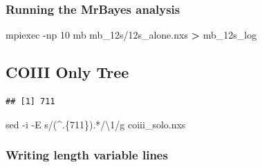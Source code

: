 \documentclass[
]{article}
\newenvironment{Shaded}{\begin{snugshade}}{\end{snugshade}}
\newcommand{\AttributeTok}[1]{\textcolor[rgb]{0.77,0.63,0.00}{#1}}
\newcommand{\DecValTok}[1]{\textcolor[rgb]{0.00,0.00,0.81}{#1}}
\newcommand{\ExtensionTok}[1]{#1}
\newcommand{\FunctionTok}[1]{\textcolor[rgb]{0.00,0.00,0.00}{#1}}
\newcommand{\NormalTok}[1]{#1}
\newcommand{\OperatorTok}[1]{\textcolor[rgb]{0.81,0.36,0.00}{\textbf{#1}}}
\newcommand{\OtherTok}[1]{\textcolor[rgb]{0.56,0.35,0.01}{#1}}
\newcommand{\SpecialCharTok}[1]{\textcolor[rgb]{0.00,0.00,0.00}{#1}}
\newcommand{\StringTok}[1]{\textcolor[rgb]{0.31,0.60,0.02}{#1}}
\begin{document}
\hypertarget{running-the-mrbayes-analysis}{%
\subsubsection{Running the MrBayes
analysis}\label{running-the-mrbayes-analysis}}

\begin{Shaded}
\begin{Highlighting}[]
\ExtensionTok{mpiexec} \AttributeTok{{-}np}\NormalTok{ 10 mb mb\_12s/12s\_alone.nxs }\OperatorTok{\textgreater{}}\NormalTok{ mb\_12s\_log}
\end{Highlighting}
\end{Shaded}

\hypertarget{coiii-only-tree}{%
\subsection{COIII Only Tree}\label{coiii-only-tree}}

\begin{Shaded}
\end{Shaded}

\begin{verbatim}
## [1] 711
\end{verbatim}

\begin{Shaded}
\begin{Highlighting}[]
\FunctionTok{sed} \AttributeTok{{-}i} \AttributeTok{{-}E} \StringTok{\textquotesingle{}s/(\^{}.\{711\}).*/\textbackslash{}1/g\textquotesingle{}}\NormalTok{ coiii\_solo.nxs}
\end{Highlighting}
\end{Shaded}

\hypertarget{writing-length-variable-lines-1}{%
\subsubsection{Writing length variable
lines}\label{writing-length-variable-lines-1}}
\end{document}
